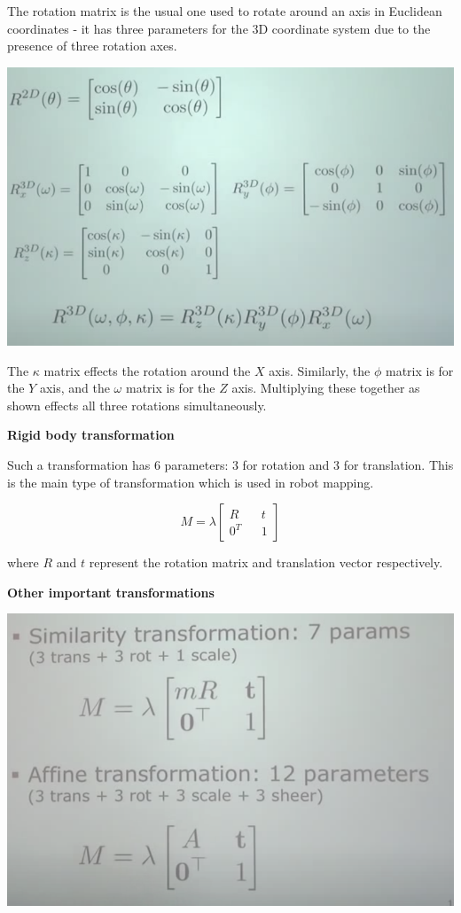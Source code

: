 \documentclass[a4paper]{article}
\begin{document}
The rotation matrix is the usual one used to rotate around an axis in Euclidean coordinates - it has three parameters for the 3D coordinate system due to the presence of three rotation axes.

\begin{center}
\includegraphics[scale=0.5]{rotmats}
\end{center}

The $\kappa$ matrix effects the rotation around the $X$ axis. Similarly, the $\phi$ matrix is for the $Y$ axis, and the $\omega$ matrix is for the $Z$ axis. Multiplying these together as shown effects all three rotations simultaneously.

\textbf{Rigid body transformation}

Such a transformation has 6 parameters: 3 for rotation and 3 for translation. This is the main type of transformation which is used in robot mapping.

\begin{equation*}
M = \lambda
\begin{bmatrix}
R && t \\
0^T && 1
\end{bmatrix}
\end{equation*}

where $R$ and $t$ represent the rotation matrix and translation vector respectively.

\textbf{Other important transformations}

\begin{center}
\includegraphics[scale=0.5]{imptras1}
\end{center}
\end{document}
